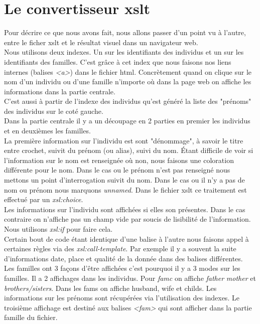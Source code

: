 \documentclass[12pt,a4paper]{article}
\begin{document}
\section{Le convertisseur xslt}

Pour décrire ce que nous avons fait, nous allons passer d'un point vu à
l'autre, entre le ficher xslt et le résultat visuel dans un navigateur web.\\

Nous utilisons deux indexes. Un sur les identifiants des individus et un sur
les identifiants des familles. C'est grâce à cet index que nous faisons nos
liens internes (balises \emph{<a>}) dans le fichier html. Concrètement quand on clique
sur le nom d'un individu ou d'une famille n'importe où dans la page web on
affiche les informations dans la partie centrale.\\

C'est aussi à partir de l'indexe des individus qu'est généré la liste des
"prénoms" des individus sur le coté gauche.\\

Dans la partie centrale il y a un découpage en 2 parties en premier les
individus et en deuxièmes les familles.\\

La première information sur l’individu est sont "dénommage", à savoir le titre
entre crochet, suivit du prénom (ou alias), suivi du nom.
Étant difficile de voir si l'information sur le nom est renseignée où non, nous
faisons une coloration différente pour le nom. Dans le cas ou le prénom n'est
pas renseigné nous mettons un point d'interrogation suivit du nom. Dans le cas
ou il n'y a pas de nom ou prénom nous marquons \textit{unnamed}. Dans le fichier xslt ce
traitement est effectué par un \emph{xsl:choice}.\\

Les informations sur l'individu sont affichées si elles son présentes. Dans le
cas contraire on n'affiche pas un champ vide par soucis de lisibilité de
l'information. Nous utilisons \emph{xsl:if} pour faire cela.\\

Certain bout de code étant identique d'une balise à l'autre nous faisons
appel à certaines règles via des \emph{xsl:call-template}. Par exemple il y a souvent
la suite d'informations date, place et qualité de la donnée dans des balises
différentes.\\

Les familles ont 3 façons d'être affichées c'est pourquoi il y a 3 modes sur
les familles. Il a 2 affichages dans les individus. Pour \emph{famc} on affiche \emph{father}
\emph{mother} et \emph{brothers/sisters}. Dans les fams on affiche husband, wife et childs.
Les informations sur les prénoms sont récupérées via l’utilisation des indexes.
Le troisième affichage est destiné aux balises \emph{<fam>} qui sont afficher dans la
partie famille du fichier.
\end{document}
